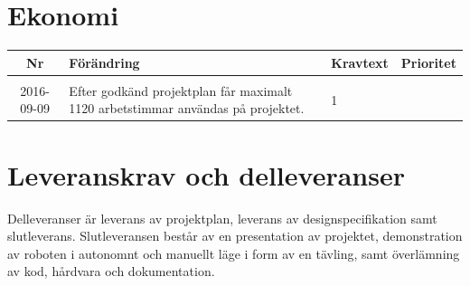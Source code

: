 \documentclass[a4paper,titlepage,12pt]{article}
\newcounter{reqNr}
\newcounter{reqNrII}
\newcommand{\nextReqNrII}{\stepcounter{reqNrII}\arabic{reqNrII}}
\newcommand{\newRequirement}[1] {\pbox{5cm}{Tillagt \\#1}}
\begin{document}
	\section{Ekonomi}

	\begin{longtable}[c]{ c l>{\raggedright}p{} l }
		\textbf{Nr} & \textbf{Förändring} & \textbf{Kravtext} & \textbf{Prioritet} 
		\\ \midrule
		
		\nextReqNrII{} \newRequirement{2016-09-09} & Efter godkänd projektplan får
		maximalt 1120 arbetstimmar användas på projektet. & 1
	\end{longtable}

	\section{Leveranskrav och delleveranser}
	Delleveranser är leverans av projektplan, leverans av designspecifikation 
	samt slutleverans. Slutleveransen består av en presentation av projektet, 
	demonstration av roboten i autonomnt och manuellt läge i form av en tävling,
	samt överlämning av kod, hårdvara och dokumentation.
\end{document}
